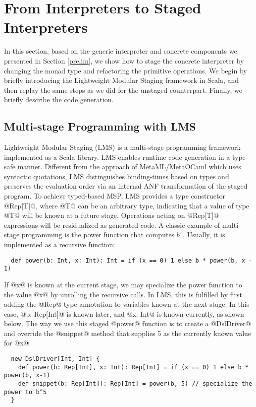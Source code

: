 \section{From Interpreters to Staged Interpreters} \label{stagedinterp}

In this section, based on the generic interpreter and concrete components we
presented in Section \ref{prelim}, we show how to stage the concrete
interpreter by changing the monad type and refactoring the primitive
operations. We begin by briefly introducing the Lightweight Modular Staging
framework in Scala, and then replay the same steps as we did for the unstaged
counterpart. Finally, we briefly describe the code generation.

\subsection{Multi-stage Programming with LMS}

Lightweight Modular Staging (LMS) \cite{DBLP:conf/gpce/RompfO10} is a
multi-stage programming framework implemented as a Scala library. LMS enables
runtime code generation in a type-safe manner. Different from the approach of
MetaML/MetaOCaml \cite{DBLP:conf/flops/Kiselyov14,
DBLP:conf/gpce/CalcagnoTHL03} which uses syntactic quotations, LMS
distinguishes binding-times based on types and preserves the evaluation order
via an internal ANF transformation of the staged program.
To achieve typed-based MSP, LMS provides a type constructor @Rep[T]@, where @T@
can be an arbitrary type, indicating that a value of type @T@ will be known at
a future stage.  Operations acting on @Rep[T]@ expressions will be residualized
as generated code.
A classic example of multi-stage programming is the power function
that computes $b^x$. Usually, it is implemented as a recursive function:
\begin{lstlisting}
  def power(b: Int, x: Int): Int = if (x == 0) 1 else b * power(b, x - 1)
\end{lstlisting}

If @x@ is known at the current stage, we may specialize the power function to
the value @x@ by unrolling the recursive calls. In LMS, this is fulfilled by
first adding the @Rep@ type annotation to variables known at the next stage. In this case,
@b: Rep[Int]@ is known later, and @x: Int@ is known currently, as shown below.
The way we use this staged @power@ function is to create a @DslDriver@ and override the
@snippet@ method that supplies 5 as the currently known value for @x@.
\begin{lstlisting}
  new DslDriver[Int, Int] {
    def power(b: Rep[Int], x: Int): Rep[Int] = if (x == 0) 1 else b * power(b, x-1)
    def snippet(b: Rep[Int]): Rep[Int] = power(b, 5) // specialize the power to b^5
  }
\end{lstlisting}

